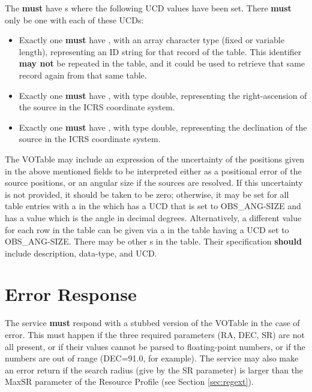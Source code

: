 \documentclass[11pt,a4paper]{ivoa}
\begin{document}
The  \textbf{must} have s where the following UCD values have been set. There \textbf{must} only be one  with each of these UCDs:
\begin{itemize}
	\item Exactly one  \textbf{must} have , with an array character type (fixed or variable length), representing an ID string for that record of the table. This identifier \textbf{may not} be repeated in the table, and it could be used to retrieve that same record again from that same table.
	\item Exactly one  \textbf{must} have , with type double, representing the right-ascension of the source in the ICRS coordinate system.
	\item Exactly one  \textbf{must} have , with type double, representing the declination of the source in the ICRS coordinate system.
\end{itemize}
The VOTable may include an expression of the uncertainty of the positions given in the above mentioned fields to be interpreted either as a positional error of the source positions, or an angular size if the sources are resolved. If this uncertainty is not provided, it should be taken to be zero; otherwise, it may be set for all table entries with a  in the  which has a UCD that is set to OBS\_ANG-SIZE and has a value which is the angle in decimal degrees. Alternatively, a different value for each row in the table can be given via a  in the table having a UCD set to OBS\_ANG-SIZE.
There may be other s in the table. Their specification \textbf{should} include description, data-type, and UCD.

\section{Error Response}
\label{sec:error}
The service \textbf{must} respond with a stubbed version of the VOTable in the case of error. This must happen if the three required parameters (RA, DEC, SR) are not all present, or if their values cannot be parsed to floating-point numbers, or if the numbers are out of range (DEC=91.0, for example). The service may also make an error return if the search radius (give by the SR parameter) is larger than the MaxSR parameter of the Resource Profile (see Section \ref{sec:regext}).
\end{document}
